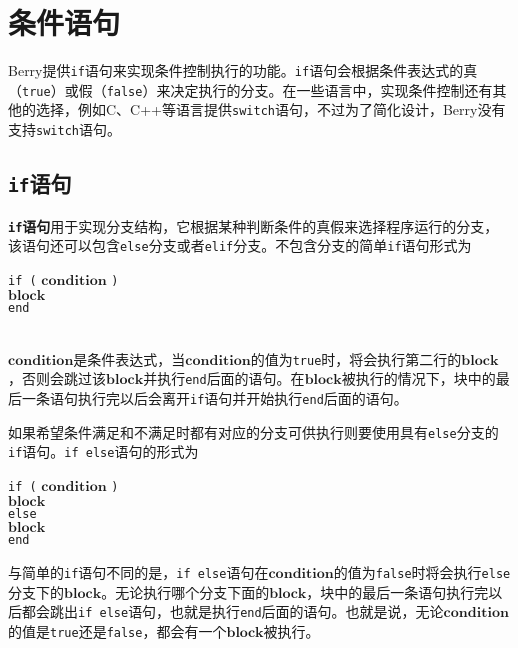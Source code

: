\section{条件语句}

Berry提供\texttt{if}语句来实现条件控制执行的功能。\texttt{if}语句会根据条件表达式的真（\texttt{true}）或假（\texttt{false}）来决定执行的分支。在一些语言中，实现条件控制还有其他的选择，例如C、C++等语言提供\texttt{switch}语句，不过为了简化设计，Berry没有支持\texttt{switch}语句。

\subsection{\texttt{if}语句}

\textbf{\texttt{if}语句}用于实现分支结构，它根据某种判断条件的真假来选择程序运行的分支，该语句还可以包含\texttt{else}分支或者\texttt{elif}分支。不包含分支的简单\texttt{if}语句形式为
\begin{algorithm}
    \texttt{if (} $\bm{condition}$ \texttt{)} \\
    \qquad $\bm{block}$ \\
    \texttt{end}
\end{algorithm}\vspace{-0.6em}\\
$\bm{condition}$是条件表达式，当$\bm{condition}$的值为\texttt{true}时，将会执行第二行的$\bm{block}$，否则会跳过该$\bm{block}$并执行\texttt{end}后面的语句。在$\bm{block}$被执行的情况下，块中的最后一条语句执行完以后会离开\texttt{if}语句并开始执行\texttt{end}后面的语句。

如果希望条件满足和不满足时都有对应的分支可供执行则要使用具有\texttt{else}分支的\texttt{if}语句。\texttt{if else}语句的形式为
\begin{algorithm}
    \texttt{if (} $\bm{condition}$ \texttt{)} \\
        \qquad $\bm{block}$ \\
    \texttt{else} \\
        \qquad $\bm{block}$ \\
    \texttt{end}
\end{algorithm}\vspace{-0.6em}

与简单的\texttt{if}语句不同的是，\texttt{if else}语句在$\bm{condition}$的值为\texttt{false}时将会执行\texttt{else}分支下的$\bm{block}$。无论执行哪个分支下面的$\bm{block}$，块中的最后一条语句执行完以后都会跳出\texttt{if else}语句，也就是执行\texttt{end}后面的语句。也就是说，无论$\bm{condition}$的值是\texttt{true}还是\texttt{false}，都会有一个$\bm{block}$被执行。

